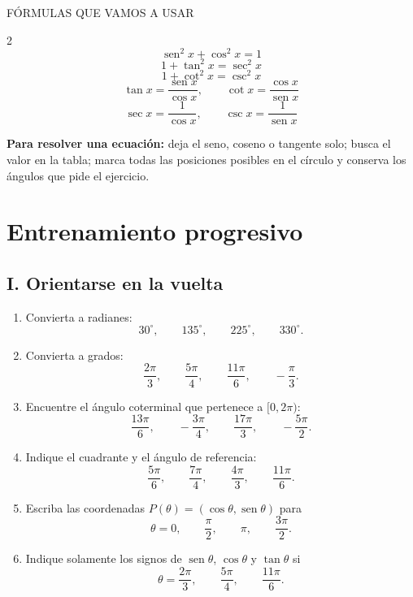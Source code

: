 \documentclass[letterpaper,12pt]{article}
\newcommand{\seno}{\operatorname{sen}}
\newcommand{\tituloSeccion}[1]{%
    \needspace{4\baselineskip}
    \subsection*{\color{azulFuerte}#1}
}
\begin{document}
\begin{teoriabox}{FÓRMULAS QUE VAMOS A USAR}
\begin{multicols}{2}
\[
\boxed{\seno^2x+\cos^2x=1}
\]
\[
\boxed{1+\tan^2x=\sec^2x}
\]
\[
\boxed{1+\cot^2x=\csc^2x}
\]
\columnbreak
\[
\tan x=\frac{\seno x}{\cos x},
\qquad
\cot x=\frac{\cos x}{\seno x}
\]
\[
\sec x=\frac{1}{\cos x},
\qquad
\csc x=\frac{1}{\seno x}
\]
\end{multicols}
\vspace{-0.3cm}
\textbf{Para resolver una ecuación:} deja el seno, coseno o tangente solo; busca el valor en la tabla; marca todas las posiciones posibles en el círculo y conserva los ángulos que pide el ejercicio.
\end{teoriabox}

\section*{\color{azulFuerte}Entrenamiento progresivo}

\tituloSeccion{I. Orientarse en la vuelta}
\begin{enumerate}[label=\color{azulFuerte}\textbf{\arabic*.},leftmargin=*]
    \item Convierta a radianes:
    \[
        30^\circ,\qquad 135^\circ,\qquad 225^\circ,\qquad 330^\circ.
    \]
    \item Convierta a grados:
    \[
        \frac{2\pi}{3},\qquad \frac{5\pi}{4},\qquad \frac{11\pi}{6},\qquad -\frac{\pi}{3}.
    \]
    \item Encuentre el ángulo coterminal que pertenece a \([0,2\pi)\):
    \[
        \frac{13\pi}{6},\qquad -\frac{3\pi}{4},\qquad \frac{17\pi}{3},\qquad -\frac{5\pi}{2}.
    \]
    \item Indique el cuadrante y el ángulo de referencia:
    \[
        \frac{5\pi}{6},\qquad \frac{7\pi}{4},\qquad \frac{4\pi}{3},\qquad \frac{11\pi}{6}.
    \]
    \item Escriba las coordenadas \(P(\theta)=(\cos\theta,\seno\theta)\) para
    \[
        \theta=0,\qquad \frac{\pi}{2},\qquad \pi,\qquad \frac{3\pi}{2}.
    \]
    \item Indique solamente los signos de \(\seno\theta\), \(\cos\theta\) y \(\tan\theta\) si
    \[
        \theta=\frac{2\pi}{3},\qquad \frac{5\pi}{4},\qquad \frac{11\pi}{6}.
    \]
\end{enumerate}
\end{document}
